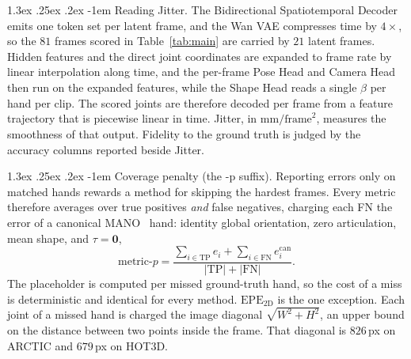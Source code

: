 \documentclass[10pt,twocolumn,letterpaper]{article}
\makeatletter
\renewcommand\paragraph{\@startsection{paragraph}{4}{\z@}%
  {1.3ex \@plus .25ex \@minus .2ex}%
  {-1em}%
  {\normalfont\normalsize\bfseries}}
\makeatother
\begin{document}
\paragraph{Reading Jitter.} The Bidirectional Spatiotemporal Decoder emits one token set per latent frame, and the Wan VAE compresses time by $4\times$, so the $81$ frames scored in Table~\ref{tab:main} are carried by $21$ latent frames. Hidden features and the direct joint coordinates are expanded to frame rate by linear interpolation along time, and the per-frame Pose Head and Camera Head then run on the expanded features, while the Shape Head reads a single $\hat\beta$ per hand per clip. The scored joints are therefore decoded per frame from a feature trajectory that is piecewise linear in time. Jitter, in $\mathrm{mm}/\mathrm{frame}^2$, measures the smoothness of that output. Fidelity to the ground truth is judged by the accuracy columns reported beside Jitter.


\paragraph{Coverage penalty (the \mbox{-p} suffix).} Reporting errors only on matched hands rewards a method for skipping the hardest frames. Every metric therefore averages over true positives \emph{and} false negatives, charging each FN the error of a canonical MANO~\citep{mano2017} hand: identity global orientation, zero articulation, mean shape, and $\tau=\mathbf{0}$,
\begin{equation}
\mathrm{metric}\text{-}p=\frac{\sum_{i\in\mathrm{TP}} e_i+\sum_{i\in\mathrm{FN}} e^{\mathrm{can}}_i}{|\mathrm{TP}|+|\mathrm{FN}|}.
\end{equation}
The placeholder is computed per missed ground-truth hand, so the cost of a miss is deterministic and identical for every method. $\mathrm{EPE_{2D}}$ is the one exception. Each joint of a missed hand is charged the image diagonal $\sqrt{W^2+H^2}$, an upper bound on the distance between two points inside the frame. That diagonal is $826$\,px on ARCTIC and $679$\,px on HOT3D.
\end{document}
